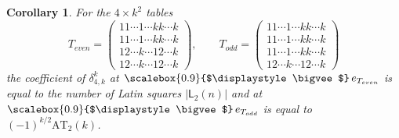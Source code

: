 \documentclass[12pt, reqno]{amsart}
\newtheorem{corollary}[theorem]{Corollary}
\theoremstyle{definition}
\let\oldbigvee\bigvee
\renewcommand{\bigvee}{
  \mathop{
    \vcenter{
      \hbox{\scalebox{0.9}{$\displaystyle\oldbigvee$}}
    }
  }
}
\begin{document}
\begin{corollary}
    For the $4 \times k^2$ tables
    $$
    T_{even} = \begin{pmatrix}
        11\cdots 1 \cdots kk \cdots k\\
        11\cdots 1 \cdots kk \cdots k\\
        12\cdots k \cdots 12\cdots k\\
        12\cdots k \cdots 12\cdots k
    \end{pmatrix}, \qquad
    T_{odd} = \begin{pmatrix}
        11\cdots 1 \cdots kk \cdots k\\
        11\cdots 1 \cdots kk \cdots k\\
        11\cdots 1 \cdots kk \cdots k\\
        12\cdots k \cdots 12\cdots k
    \end{pmatrix}
    $$
    the coefficient of $\delta_{4,k}^k$ at $\bigvee e_{T_{even}}$ is equal to the number of Latin squares $|\mathsf{L}_2(n)|$ and at $\bigvee e_{T_{odd}}$ is equal to $(-1)^{k/2}\mathrm{AT}_2(k)$.
\end{corollary}


\end{document}
